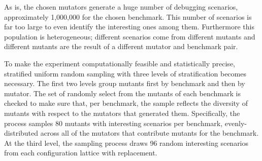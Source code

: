 

As is, the chosen mutators generate a huge number of debugging scenarios,
approximately 1,000,000 for the chosen benchmark. This number of scenarios is
far too large to even identify the interesting ones among them.  Furthermore
this population is heterogeneous; different scenarios come from different
mutants and different mutants are the result of a different mutator and
benchmark pair.

To make the experiment computationally feasible and statistically precise,
stratified uniform random sampling with three levels of stratification becomes
necessary.  The first two levels group mutants first by benchmark and then by
mutator.  The set of randomly select from the mutants of each benchmark is
checked to make sure that, per benchmark, the sample reflects the diversity of
mutants with respect to the mutators that generated them.  Specifically, the
process samples 80 mutants with interesting scenarios per benchmark,
evenly-distributed across all of the mutators that contribute mutants for the
benchmark.  At the third level, the sampling process draws 96 random interesting
scenarios from each configuration lattice with replacement. 


 



